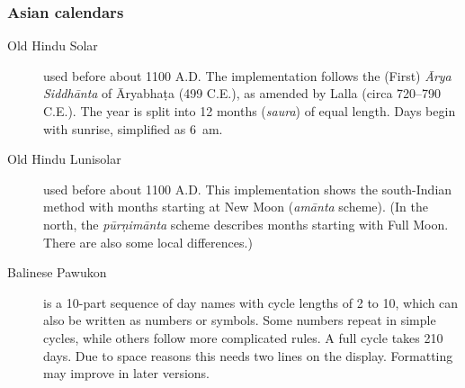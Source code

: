 \subsubsection{Asian calendars}
\begin{description}
\item[Old Hindu Solar] used before about 1100 A.D. The implementation follows the 
  (First) \emph{\=Arya Siddh\=anta} of \=Aryabha\d{t}a (499 C.E.), 
  as amended by Lalla (circa 720--790 C.E.).
  The year is split into 12 months (\emph{saura}) of equal length. 
  Days begin with sunrise, simplified as 6~am.
\item[Old Hindu Lunisolar] used before about 1100 A.D. 
  This implementation shows the south-Indian method 
  with months starting at New Moon (\emph{am\=anta} scheme). 
  (In the north, the \emph{p\=ur\d{n}im\=anta} scheme describes months 
  starting with Full Moon. There are also some local differences.)
\item[Balinese Pawukon] is a 10-part sequence of day names with cycle
  lengths of 2 to 10, which can also be written as numbers or
  symbols. Some numbers repeat in simple cycles, while others follow
  more complicated rules. A full cycle takes 210 days.  Due to space
  reasons this needs two lines on the display. Formatting may improve
  in later versions.
\end{description}

